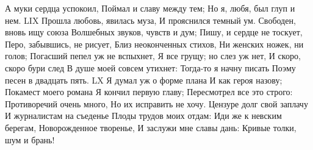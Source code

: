 А муки сердца успокоил,
Поймал и славу между тем;
Но я, любя, был глуп и нем.
LIX
Прошла любовь, явилась муза,
И прояснился темный ум.
Свободен, вновь ищу союза
Волшебных звуков, чувств и дум;
Пишу, и сердце не тоскует,
Перо, забывшись, не рисует,
Близ неоконченных стихов,
Ни женских ножек, ни голов;
Погасший пепел уж не вспыхнет,
Я все грущу; но слез уж нет,
И скоро, скоро бури след
В душе моей совсем утихнет:
Тогда-то я начну писать
Поэму песен в двадцать пять.
LX
Я думал уж о форме плана
И как героя назову;
Покамест моего романа
Я кончил первую главу;
Пересмотрел все это строго:
Противоречий очень много,
Но их исправить не хочу.
Цензуре долг свой заплачу
И журналистам на съеденье
Плоды трудов моих отдам:
Иди же к невским берегам,
Новорожденное творенье,
И заслужи мне славы дань:
Кривые толки, шум и брань!